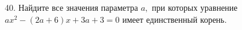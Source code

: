 40. Найдите все значения параметра $a,$ при которых уравнение $ax^2-(2a+6)x+3a+3=0$ имеет единственный корень.\\
